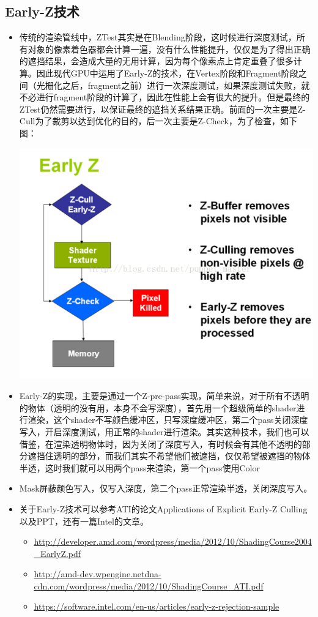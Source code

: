 \documentclass[9pt, b5paper]{article}
\begin{document}
\subsection{Early-Z技术}
\label{sec-2-7}
\begin{itemize}
\item 传统的渲染管线中，ZTest其实是在Blending阶段，这时候进行深度测试，所有对象的像素着色器都会计算一遍，没有什么性能提升，仅仅是为了得出正确的遮挡结果，会造成大量的无用计算，因为每个像素点上肯定重叠了很多计算。因此现代GPU中运用了Early-Z的技术，在Vertex阶段和Fragment阶段之间（光栅化之后，fragment之前）进行一次深度测试，如果深度测试失败，就不必进行fragment阶段的计算了，因此在性能上会有很大的提升。但是最终的ZTest仍然需要进行，以保证最终的遮挡关系结果正确。前面的一次主要是Z-Cull为了裁剪以达到优化的目的，后一次主要是Z-Check，为了检查，如下图：

\includegraphics[width=.9\linewidth]{./pic/earlyz.png}
\item Early-Z的实现，主要是通过一个Z-pre-pass实现，简单来说，对于所有不透明的物体（透明的没有用，本身不会写深度），首先用一个超级简单的shader进行渲染，这个shader不写颜色缓冲区，只写深度缓冲区，第二个pass关闭深度写入，开启深度测试，用正常的shader进行渲染。其实这种技术，我们也可以借鉴，在渲染透明物体时，因为关闭了深度写入，有时候会有其他不透明的部分遮挡住透明的部分，而我们其实不希望他们被遮挡，仅仅希望被遮挡的物体半透，这时我们就可以用两个pass来渲染，第一个pass使用Color
\item Mask屏蔽颜色写入，仅写入深度，第二个pass正常渲染半透，关闭深度写入。
\item 关于Early-Z技术可以参考ATI的论文Applications of Explicit Early-Z Culling以及PPT，还有一篇Intel的文章。 
\begin{itemize}
\item \url{http://developer.amd.com/wordpress/media/2012/10/ShadingCourse2004_EarlyZ.pdf}
\item \url{http://amd-dev.wpengine.netdna-cdn.com/wordpress/media/2012/10/ShadingCourse_ATI.pdf}
\item \url{https://software.intel.com/en-us/articles/early-z-rejection-sample}
\end{itemize}
\end{itemize}
\end{document}

